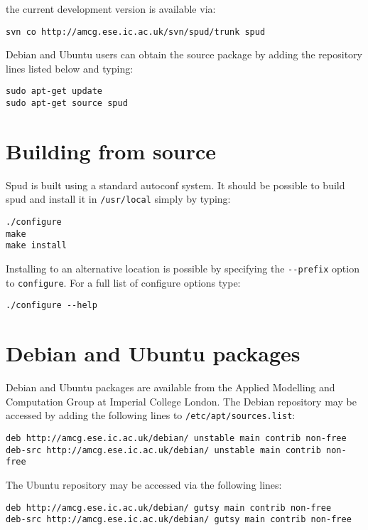 \documentclass[a4paper, 11pt]{book}
\begin{document}
the current development version is available via:

\begin{verbatim}
svn co http://amcg.ese.ic.ac.uk/svn/spud/trunk spud
\end{verbatim}

Debian and Ubuntu users can obtain the source package by adding the
repository lines listed below and typing:

\begin{verbatim}
sudo apt-get update
sudo apt-get source spud
\end{verbatim}

\section{Building from source}

Spud is built using a standard autoconf system. It should be possible to
build spud and install it in \verb+/usr/local+ simply by typing:

\begin{verbatim}
./configure
make
make install
\end{verbatim}

Installing to an alternative location is possible by specifying the
\verb+--prefix+ option to \verb+configure+. For a full list of configure
options type:

\begin{verbatim}
./configure --help
\end{verbatim}

\section{Debian and Ubuntu packages}

Debian and Ubuntu packages are available from the Applied Modelling and
Computation Group at Imperial College London. The Debian repository may be
accessed by adding the following lines to \verb+/etc/apt/sources.list+:

\begin{verbatim}
deb http://amcg.ese.ic.ac.uk/debian/ unstable main contrib non-free
deb-src http://amcg.ese.ic.ac.uk/debian/ unstable main contrib non-free
\end{verbatim}

The Ubuntu repository may be accessed via the following lines:

\begin{verbatim}
deb http://amcg.ese.ic.ac.uk/debian/ gutsy main contrib non-free
deb-src http://amcg.ese.ic.ac.uk/debian/ gutsy main contrib non-free
\end{verbatim}
\end{document}
